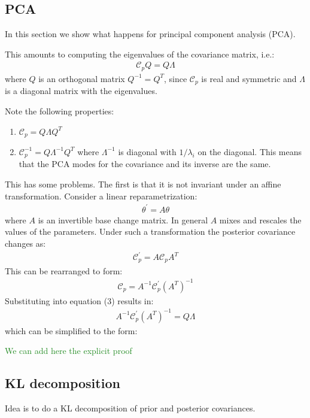 \documentclass[aps,nofootinbib,notitlepage,superscriptaddress,twocolumn,10pt,prd]{revtex4-1}
\newcommand{\mr}[1]{\textcolor{ForestGreen}{#1}}
\begin{document}
%
\subsection{PCA}
%
In this section we show what happens for principal component analysis (PCA).

This amounts to computing the eigenvalues of the covariance matrix, i.e.:
\begin{align}
\mathcal{C}_p Q = Q \Lambda
\end{align}
where $Q$ is an orthogonal matrix $Q^{-1} = Q^T$, since $\mathcal{C}_p$ is real and symmetric and $\Lambda$ is a diagonal matrix with the eigenvalues.

Note the following properties:
\begin{enumerate}
\item $\mathcal{C}_p = Q \Lambda Q^T$
\item $\mathcal{C}_p^{-1} = Q \Lambda^{-1} Q^T$ where $\Lambda^{-1}$ is diagonal with $1/\lambda_i$ on the diagonal. This means that the PCA modes for the covariance and its inverse are the same.
\end{enumerate}

This has some problems. The first is that it is not invariant under an affine transformation.
Consider a linear reparametrization:
\begin{align}
\theta^\prime = A \theta
\end{align}
where $A$ is an invertible base change matrix. In general $A$ mixes and rescales the values of the parameters.
Under such a transformation the posterior covariance changes as:
\begin{align}
\mathcal{C}_p^\prime = A \mathcal{C}_p A^T
\end{align}
This can be rearranged to form:
\begin{align}
\mathcal{C}_p = A^{-1} \mathcal{C}_p^\prime (A^T)^{-1}
\end{align}
Substituting into equation (3) results in:
\begin{align}
A^{-1} \mathcal{C}_p^\prime (A^T)^{-1} = Q \Lambda
\end{align}
which can be simplified to the form:


\mr{We can add here the explicit proof}

%
\subsection{KL decomposition}
%

Idea is to do a KL decomposition of prior and posterior covariances.
\end{document}
